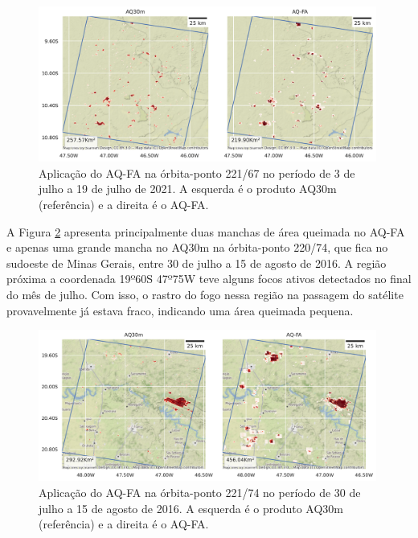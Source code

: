 \documentclass[cic,tc]{iiufrgs}
\begin{document}
\begin{figure}[!htb]
    \caption{Aplicação do AQ-FA na órbita-ponto 221/67 no período de 3 de julho a 19 de julho de 2021. A esquerda é o produto AQ30m (referência) e a direita é o AQ-FA.}
    \begin{center}
        \includegraphics[width=30em]{validacao_AQ30m_221_67}
    \end{center}
    \label{fig:validacao_221_67}
\end{figure}

A Figura \ref{fig:validacao_220_74} apresenta principalmente duas manchas de área queimada no AQ-FA e apenas uma grande mancha no AQ30m na órbita-ponto 220/74, que fica no sudoeste de Minas Gerais, entre 30 de julho a 15 de agosto de 2016. A região próxima a coordenada 19º60\textquotesingle S 47º75\textquotesingle W teve alguns focos ativos detectados no final do mês de julho. Com isso, o rastro do fogo nessa região na passagem do satélite provavelmente já estava fraco, indicando uma área queimada pequena.

\begin{figure}[!htb]
    \caption{Aplicação do AQ-FA na órbita-ponto 221/74 no período de 30 de julho a 15 de agosto de 2016. A esquerda é o produto AQ30m (referência) e a direita é o AQ-FA.}
    \begin{center}
        \includegraphics[width=30em]{validacao_AQ30m_220_74}
    \end{center}
    \label{fig:validacao_220_74}
\end{figure}
\end{document}
